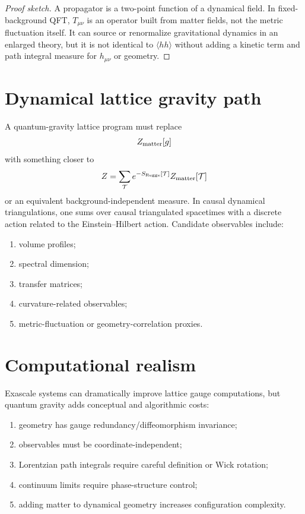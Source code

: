 \documentclass[11pt]{article}
\theoremstyle{remark}
\begin{document}
\begin{proof}[Proof sketch]
A propagator is a two-point function of a dynamical field. In fixed-background QFT, $T_{\mu\nu}$ is an operator built from matter fields, not the metric fluctuation itself. It can source or renormalize gravitational dynamics in an enlarged theory, but it is not identical to $\langle h h\rangle$ without adding a kinetic term and path integral measure for $h_{\mu\nu}$ or geometry.
\end{proof}

\section{Dynamical lattice gravity path}

A quantum-gravity lattice program must replace
\begin{equation}
Z_{\rm matter}[g]
\end{equation}
with something closer to
\begin{equation}
Z=\sum_{\mathcal T} e^{-S_{\rm Regge}[\mathcal T]} Z_{\rm matter}[\mathcal T]
\end{equation}
or an equivalent background-independent measure. In causal dynamical triangulations, one sums over causal triangulated spacetimes with a discrete action related to the Einstein--Hilbert action. Candidate observables include:
\begin{enumerate}[label=(\roman*)]
\item volume profiles;
\item spectral dimension;
\item transfer matrices;
\item curvature-related observables;
\item metric-fluctuation or geometry-correlation proxies.
\end{enumerate}

\section{Computational realism}

Exascale systems can dramatically improve lattice gauge computations, but quantum gravity adds conceptual and algorithmic costs:
\begin{enumerate}[label=(\alph*)]
\item geometry has gauge redundancy/diffeomorphism invariance;
\item observables must be coordinate-independent;
\item Lorentzian path integrals require careful definition or Wick rotation;
\item continuum limits require phase-structure control;
\item adding matter to dynamical geometry increases configuration complexity.
\end{enumerate}
\end{document}
